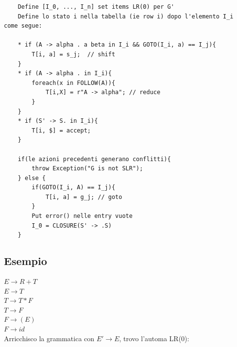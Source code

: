 \begin{lstlisting}
    Define [I_0, ..., I_n] set items LR(0) per G'
    Define lo stato i nella tabella (ie row i) dopo l'elemento I_i come segue:

    * if (A -> alpha . a beta in I_i && GOTO(I_i, a) == I_j){
        T[i, a] = s_j;  // shift
    }
    * if (A -> alpha . in I_i){
        foreach(x in FOLLOW(A)){
            T[i,X] = r"A -> alpha"; // reduce
        }
    }
    * if (S' -> S. in I_i){
        T[i, $] = accept;
    }

    if(le azioni precedenti generano conflitti){
        throw Exception("G is not SLR");
    } else {
        if(GOTO(I_i, A) == I_j){
            T[i, a] = g_j; // goto
        }
        Put error() nelle entry vuote
        I_0 = CLOSURE(S' -> .S)
    }
\end{lstlisting}

\subsection{Esempio}
$E \rightarrow R + T$ \\
$E \rightarrow T$ \\
$T \rightarrow T * F$ \\
$T \rightarrow F$ \\
$F \rightarrow (E)$ \\
$F \rightarrow id$ \\

Arricchisco la grammatica con $E' \rightarrow E$, trovo l'automa LR(0):

